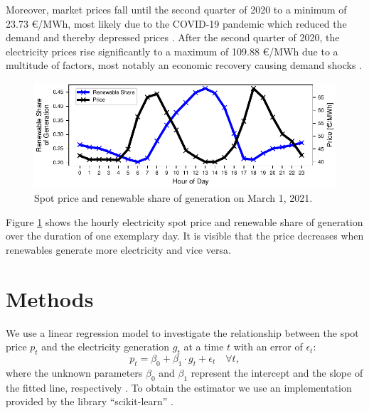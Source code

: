\documentclass{article}
\begin{document}
Moreover, market prices fall until the second quarter of 2020 to a minimum of 23.73 €/MWh, most likely due to the COVID-19 pandemic which reduced the demand and thereby depressed prices \citep{covid_electricity_systems}.
After the second quarter of 2020, the electricity prices rise significantly to a maximum of 109.88 €/MWh due to a multitude of factors, most notably an economic recovery causing demand shocks \citep{long_covid_energy_prices}. 
\begin{figure}[h]
    \centering
    \includegraphics[width=\columnwidth]{doc/fig/example_day.pdf}
    \caption{Spot price and renewable share of generation on March 1, 2021.}
    \label{fig:example_day}
\end{figure}
Figure \ref{fig:example_day} shows the hourly electricity spot price and renewable share of generation over the duration of one exemplary day. 
It is visible that the price decreases when renewables generate more electricity and vice versa. 

\section{Methods} \label{sec:methods}
We use a linear regression model to investigate the relationship between the spot price $p_t$ and the electricity generation $g_t$ at a time $t$ with an error of $\epsilon_t$:
$$
    p_t = \beta_0 + \beta_1\cdot g_t + \epsilon_t \quad \forall t,
$$
where the unknown parameters $\beta_0$ and $\beta_1$ represent the intercept and the slope of the fitted line, respectively \citep{Wasserman2004}.
To obtain the estimator we use an implementation provided by the library \enquote{scikit-learn} \citep{scikit-learn}.

\end{document}
